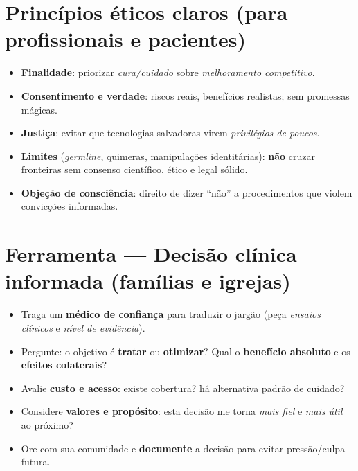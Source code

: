 \section{Princípios éticos claros (para profissionais e pacientes)}
\begin{checklist}[title={Linhas de orientação},breakable]
\begin{itemize}[leftmargin=*,noitemsep]
  \item \textbf{Finalidade}: priorizar \emph{cura/cuidado} sobre \emph{melhoramento competitivo}.
  \item \textbf{Consentimento e verdade}: riscos reais, benefícios realistas; sem promessas mágicas.
  \item \textbf{Justiça}: evitar que tecnologias salvadoras virem \emph{privilégios de poucos}.
  \item \textbf{Limites} (\emph{germline}, quimeras, manipulações identitárias): \textbf{não} cruzar fronteiras sem consenso científico, ético e legal sólido.
  \item \textbf{Objeção de consciência}: direito de dizer ``não'' a procedimentos que violem convicções informadas.
\end{itemize}
\end{checklist}

\section{Ferramenta --- Decisão clínica informada (famílias e igrejas)}
\begin{checklist}
\begin{itemize}[leftmargin=*,noitemsep]
  \item Traga um \textbf{médico de confiança} para traduzir o jargão (peça \emph{ensaios clínicos} e \emph{nível de evidência}).
  \item Pergunte: o objetivo é \textbf{tratar} ou \textbf{otimizar}? Qual o \textbf{benefício absoluto} e os \textbf{efeitos colaterais}?
  \item Avalie \textbf{custo e acesso}: existe cobertura? há alternativa padrão de cuidado?
  \item Considere \textbf{valores e propósito}: esta decisão me torna \emph{mais fiel} e \emph{mais útil} ao próximo?
  \item Ore com sua comunidade e \textbf{documente} a decisão para evitar pressão/culpa futura.
\end{itemize}
\end{checklist}

